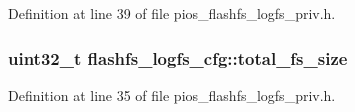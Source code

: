 \-Definition at line 39 of file pios\-\_\-flashfs\-\_\-logfs\-\_\-priv.\-h.

\hypertarget{group___p_i_o_s___f_l_a_s_h_f_s_ga36ee534fa25bdd1bece22e997e3ba800}{
\subsubsection[{total\-\_\-fs\-\_\-size}]{\setlength{\rightskip}{0pt plus 5cm}uint32\-\_\-t {\bf flashfs\-\_\-logfs\-\_\-cfg\-::total\-\_\-fs\-\_\-size}}}\label{group___p_i_o_s___f_l_a_s_h_f_s_ga36ee534fa25bdd1bece22e997e3ba800}


\-Definition at line 35 of file pios\-\_\-flashfs\-\_\-logfs\-\_\-priv.\-h.

